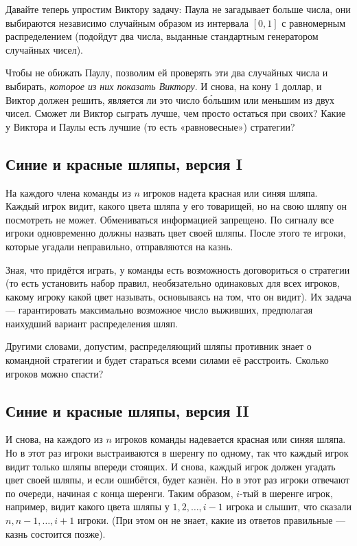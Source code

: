 Давайте теперь упростим Виктору задачу:
Паула не загадывает больше числа, они выбираются независимо случайным образом из интервала $[0,1]$ с равномерным распределением (подойдут два числа, выданные стандартным генератором случайных чисел).

Чтобы не обижать Паулу, позволим ей проверять эти два случайных числа и выбирать, \emph{которое из них показать Виктору}. %
И снова, на кону 1 доллар, и Виктор должен решить, является ли это число б\'{о}льшим или меньшим из двух чисел.
Сможет ли Виктор сыграть лучше, чем просто остаться при своих?
Какие у Виктора и Паулы есть лучшие (то есть «равновесные») стратегии?

\subsection*{Синие и красные шляпы, версия I} %

На каждого члена команды из $n$ игроков надета красная или синяя шляпа.
Каждый игрок видит, какого цвета шляпа у его товарищей, но на свою шляпу он посмотреть не может.
Обмениваться информацией запрещено.
По сигналу все игроки одновременно должны назвать цвет своей шляпы.
После этого те игроки, которые угадали неправильно,  отправляются на казнь.

Зная, что придётся играть, у команды есть возможность договориться о стратегии
(то есть установить набор правил, необязательно одинаковых для всех игроков, какому игроку какой цвет называть, основываясь на том, что он видит).
Их задача --- гарантировать максимально возможное число выживших, предполагая наихудший вариант распределения шляп.

\medskip

Другими словами, допустим, распределяющий шляпы противник знает о командной стратегии и будет стараться всеми силами её расстроить.
Сколько игроков можно спасти?


\subsection*{Синие и красные шляпы, версия II} %

И снова, на каждого из $n$ игроков команды надевается красная или синяя шляпа.
Но в этот раз игроки выстраиваются в шеренгу по одному, так что каждый игрок видит только шляпы впереди стоящих.
И снова, каждый игрок должен угадать цвет своей шляпы, и  если ошибётся, будет казнён.
Но в этот раз игроки отвечают по очереди, начиная с конца шеренги.
Таким образом, $i$-тый в шеренге игрок, например, видит какого цвета шляпы у $1, 2,\dots, i-1$ игрока и слышит, что сказали $n, n-1,\dots, i+1$ игроки.
(При этом он не знает, какие из ответов правильные --- казнь состоится позже).

